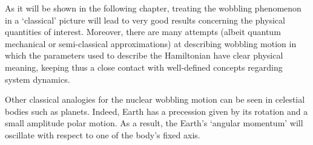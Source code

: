 As it will be shown in the following chapter, treating the wobbling phenomenon in a `classical' picture will lead to very good results concerning the physical quantities of interest. Moreover, there are many attempts (albeit quantum mechanical or semi-classical approximations) at describing wobbling motion in which the parameters used to describe the Hamiltonian have clear physical meaning, keeping thus a close contact with well-defined concepts regarding system dynamics.

Other classical analogies for the nuclear wobbling motion can be seen in celestial bodies such as planets. Indeed, Earth has a precession given by its rotation and a small amplitude polar motion. As a result, the Earth's `angular momentum' will oscillate with respect to one of the body's fixed axis.

